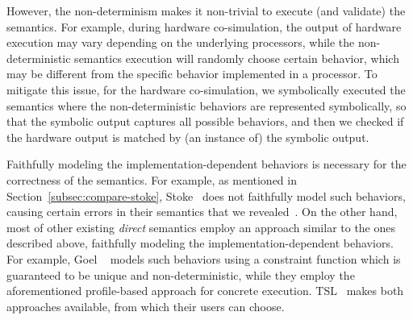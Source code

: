 However, the non-determinism makes it non-trivial to execute (and validate) the
semantics.  For example, during hardware co-simulation, the output of hardware
execution may vary depending on the underlying processors, while the
non-deterministic semantics execution will randomly choose certain behavior,
  which may be different from the specific behavior implemented in a processor.
  To mitigate this issue, for the hardware co-simulation, we symbolically
  executed the semantics where the non-deterministic behaviors are represented
  symbolically, so that the symbolic output captures all possible behaviors,
  and then we checked if the hardware output is matched by (an instance of) the
  symbolic output.

Faithfully modeling the implementation-dependent behaviors is necessary for the correctness of the semantics.
For example, as mentioned in Section~\ref{subsec:compare-stoke}, Stoke~\cite{Stoke2013} does not faithfully model such behaviors, causing certain errors in their semantics that we revealed~\cite{BugStoke986}.
On the other hand, most of other existing \emph{direct} \ISA semantics employ an approach similar to the ones described above, faithfully modeling the implementation-dependent behaviors.
For example, Goel \etal~\cite{Goel:ProCoS17} models such behaviors using a constraint function which is guaranteed to be unique and non-deterministic, while they employ the aforementioned profile-based approach for concrete execution.
TSL~\cite{TSL:TOPLAS13} makes both approaches available, from which their users can choose.



